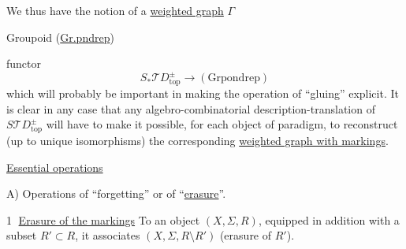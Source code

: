 We thus have the notion of a \uline{weighted graph}   $\Gamma$


Groupoid (\uline{Gr.pndrep})

functor
\[
 S_*\mathcal TD_{\mathrm{top}}^\pm\longrightarrow(\mathrm{Grpondrep})
\]
which will probably be important in making the operation of ``gluing'' explicit.
It is clear in any case that any algebro-combinatorial description-translation of
$S\mathcal TD_{\mathrm{top}}^\pm$ will have to make it possible, for each object of
 paradigm, to reconstruct (up to unique isomorphisms) the corresponding \uline{weighted graph with markings}.

\uline{Essential operations}

A) Operations of ``forgetting'' or of ``\uline{erasure}''.

\textcircled{1} \uline{Erasure of the markings} To an object $(X,\Sigma,R)$, equipped in addition with a subset $R'\subset R$, it associates $(X,\Sigma,R\setminus R')$ (erasure of $R'$).
